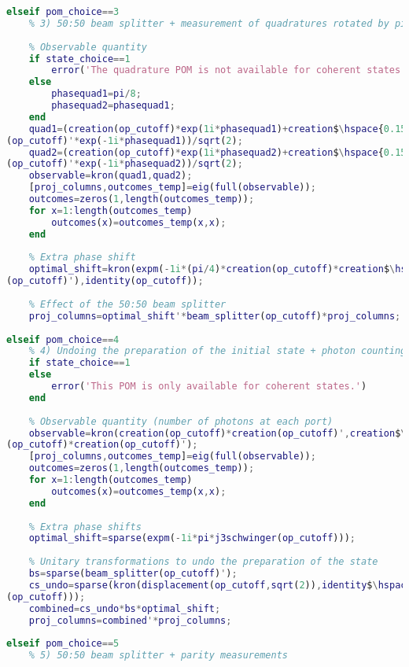 \begin{lstlisting}[language=Matlab, mathescape=true]
elseif pom_choice==3
    % 3) 50:50 beam splitter + measurement of quadratures rotated by pi/8
        
    % Observable quantity
    if state_choice==1
        error('The quadrature POM is not available for coherent states.')
    else
        phasequad1=pi/8;
        phasequad2=phasequad1;
    end
    quad1=(creation(op_cutoff)*exp(1i*phasequad1)+creation$\hspace{0.15em}\swarrow$
(op_cutoff)'*exp(-1i*phasequad1))/sqrt(2);
    quad2=(creation(op_cutoff)*exp(1i*phasequad2)+creation$\hspace{0.15em}\swarrow$
(op_cutoff)'*exp(-1i*phasequad2))/sqrt(2);
    observable=kron(quad1,quad2);
    [proj_columns,outcomes_temp]=eig(full(observable));
    outcomes=zeros(1,length(outcomes_temp));
    for x=1:length(outcomes_temp)
        outcomes(x)=outcomes_temp(x,x);
    end
    
    % Extra phase shift
    optimal_shift=kron(expm(-1i*(pi/4)*creation(op_cutoff)*creation$\hspace{0.15em}\swarrow$
(op_cutoff)'),identity(op_cutoff));
            
    % Effect of the 50:50 beam splitter
    proj_columns=optimal_shift'*beam_splitter(op_cutoff)*proj_columns;
    
elseif pom_choice==4
    % 4) Undoing the preparation of the initial state + photon counting
    if state_choice==1
    else
        error('This POM is only available for coherent states.')
    end  
    
    % Observable quantity (number of photons at each port)
    observable=kron(creation(op_cutoff)*creation(op_cutoff)',creation$\hspace{0.15em}\swarrow$
(op_cutoff)*creation(op_cutoff)');
    [proj_columns,outcomes_temp]=eig(full(observable));
    outcomes=zeros(1,length(outcomes_temp));
    for x=1:length(outcomes_temp)
        outcomes(x)=outcomes_temp(x,x);
    end
    
    % Extra phase shifts
    optimal_shift=sparse(expm(-1i*pi*j3schwinger(op_cutoff)));
    
    % Unitary transformations to undo the preparation of the state
    bs=sparse(beam_splitter(op_cutoff)');
    cs_undo=sparse(kron(displacement(op_cutoff,sqrt(2)),identity$\hspace{0.15em}\swarrow$
(op_cutoff)));
    combined=cs_undo*bs*optimal_shift;
    proj_columns=combined'*proj_columns; 
        
elseif pom_choice==5
    % 5) 50:50 beam splitter + parity measurements
    

\end{lstlisting}
